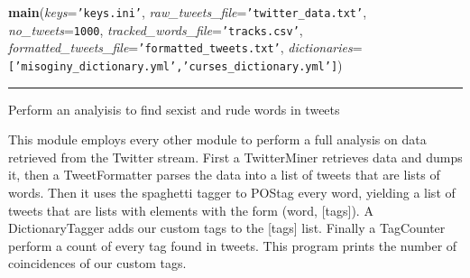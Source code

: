 \hspace{.8\funcindent}\begin{boxedminipage}{\funcwidth}

    \raggedright \textbf{main}(\textit{keys}={\tt 'keys.ini'}, \textit{raw\_tweets\_file}={\tt 'twitter\_data.txt'}, \textit{no\_tweets}={\tt 1000}, \textit{tracked\_words\_file}={\tt 'tracks.csv'}, \textit{formatted\_tweets\_file}={\tt 'formatted\_tweets.txt'}, \textit{dictionaries}={\tt ['misoginy\_dictionary.yml','curses\_dictionary.yml']})

    \vspace{-1.5ex}

    \rule{\textwidth}{0.5\fboxrule}
\setlength{\parskip}{2ex}
    Perform an analyisis to find sexist and rude words in tweets

    This module employs every other module to perform a full analysis on 
    data retrieved from the Twitter stream. First a TwitterMiner retrieves 
    data and dumps it, then a TweetFormatter parses the data into a list of
    tweets that are lists of words. Then it uses the spaghetti tagger to 
    POStag every word, yielding a list of tweets that are lists with 
    elements with the form (word, [tags]). A DictionaryTagger adds our 
    custom tags to the [tags] list. Finally a TagCounter perform a count of
    every tag found in tweets. This program prints the number of 
    coincidences of our custom tags.

\setlength{\parskip}{1ex}
    \end{boxedminipage}

